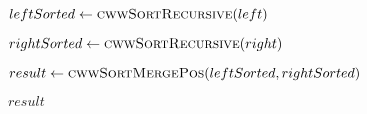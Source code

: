 \begin{frame}[containsverbatim]{\cwwalgortihmexampleframe}
\begin{columns}[c]
\begin{column}{0.35\textwidth}
{\begin{minipage}[c]{\textwidth}
\begin{algorithm}[H]
\begin{algorithmic}[1]
                                            \label{cwwSortRecursive before leftsorted}
                                            \State $leftSorted \gets \Call{cwwSortRecursive}{left}$
                                            \label{cwwSortRecursive after leftsorted}
                                            
                                            \label{cwwSortRecursive before rightsorted}
                                            \State $rightSorted \gets \Call{cwwSortRecursive}{right}$
                                            \label{cwwSortRecursive after rightsorted}

                                            \label{cwwSortRecursive before result}
                                            \State $result \gets \Call{cwwSortMergePos}{leftSorted, rightSorted}$
                                            \label{cwwSortRecursive after result}
                
                                            \State \Return $result$
                                        \EndFunction
                                    \end{algorithmic}
                                \end{algorithm}
                            \endgroup
                        \end{minipage}
                    }
                \end{column}

                \begin{column}{0.65\textwidth}
                    \vspace{-0.1cm}
                    \tiny
                    \noindent {}
\end{column}
\end{columns}
\end{frame}
